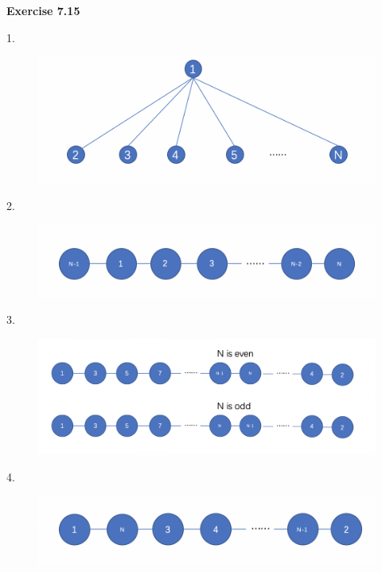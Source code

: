\documentclass{article} %
\begin{document}
	\textbf{Exercise 7.15}\par
	1.\par
  	\begin{figure}[H]
  	\centering
  	\includegraphics[scale=0.6]{7151.png}
  	\caption{}
  	\label{}
  	\end{figure}
	2.\par
  	\begin{figure}[H]
  	\centering
  	\includegraphics[scale=0.6]{7152.png}
  	\caption{}
  	\label{}
  	\end{figure}
	3.\par
  	\begin{figure}[H]
  	\centering
  	\includegraphics[scale=0.6]{7153.png}
  	\caption{}
  	\label{}
  	\end{figure}
	4.\par
  	\begin{figure}[H]
  	\centering
  	\includegraphics[scale=0.6]{7154.png}
  	\caption{}
  	\label{}
  	\end{figure}
\end{document}
